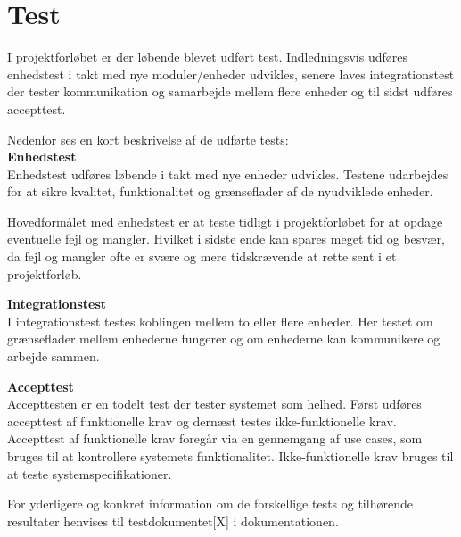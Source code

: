 \section{Test}

\label{chap:test}

I projektforløbet er der løbende blevet udført test. Indledningsvis udføres enhedstest i takt med nye moduler/enheder udvikles, senere laves integrationstest der tester kommunikation og samarbejde mellem flere enheder og til sidst udføres accepttest.

Nedenfor ses en kort beskrivelse af de udførte tests:\\


\textbf{Enhedstest} \\
Enhedstest udføres løbende i takt med nye enheder udvikles. Testene udarbejdes for at sikre kvalitet, funktionalitet og grænseflader af de nyudviklede enheder. 

Hovedformålet med enhedstest er at teste tidligt i projektforløbet for at opdage eventuelle fejl og mangler. Hvilket i sidste ende kan spares meget tid og besvær, da fejl og mangler ofte er svære og mere tidskrævende at rette sent i et projektforløb.


\textbf{Integrationstest} \\
I integrationstest testes koblingen mellem to eller flere enheder. Her testet om grænseflader mellem enhederne fungerer og om enhederne kan kommunikere og arbejde sammen.  



\textbf{Accepttest} \\
Accepttesten er en todelt test der tester systemet som helhed. 
Først udføres accepttest af funktionelle krav og dernæst testes ikke-funktionelle krav.
Accepttest af funktionelle krav foregår via en gennemgang af use cases, som bruges til at kontrollere systemets funktionalitet. Ikke-funktionelle krav bruges til at teste systemspecifikationer.  

For yderligere og konkret information om de forskellige tests og tilhørende resultater henvises til testdokumentet[X] i dokumentationen.